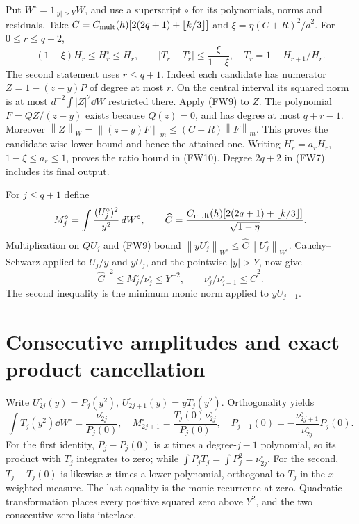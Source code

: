 \documentclass[11pt]{article}
\newcommand{\norm}[1]{\left\lVert#1\right\rVert}
\begin{document}
Put $W^\circ=1_{|y|>Y}W$, and use a superscript $\circ$ for its
polynomials, norms and residuals. Take
$C=C_{\rm mult}(h)[2(2q+1)+\lfloor k/3\rfloor]$ and
$\xi=\eta(C+R)^2/d^2$. For $0\le r\le q+2$,
\begin{equation}\tag{FW10}
 (1-\xi)H_r\le H_r^\circ\le H_r,\qquad
 |T_r-T_r^\circ|\le\frac{\xi}{1-\xi},\quad T_r=1-H_{r+1}/H_r.
\end{equation}
The second statement uses $r\le q+1$. Indeed each candidate has
numerator $Z=1-(z-y)P$ of degree at most $r$. On the central interval
its squared norm is at most $d^{-2}\int|Z|^2\dd W$ restricted there.
Apply (FW9) to $Z$. The polynomial $F=QZ/(z-y)$ exists because $Q(z)=0$,
and has degree at most $q+r-1$. Moreover
$\norm Z_W=\norm{(z-y)F}_m\le(C+R)\norm F_m$.
This proves the candidate-wise lower bound and hence the attained one.
Writing $H_r^\circ=a_rH_r$, $1-\xi\le a_r\le1$, proves the ratio
bound in (FW10). Degree $2q+2$ in (FW7) includes its final output.

For $j\le q+1$ define
\[
 M_j^\circ=\int\frac{(U_j^\circ)^2}{y^2}\,d W^\circ,
 \qquad \widehat C=\frac{C_{\rm mult}(h)[2(2q+1)+\lfloor k/3\rfloor]}{\sqrt{1-\eta}}.
\]
Multiplication on $QU_j$ and (FW9) bound
$\norm{yU_j^\circ}_{W^\circ}\le\widehat C\norm{U_j^\circ}_{W^\circ}$.
Cauchy--Schwarz applied to $U_j/y$ and $yU_j$, and the pointwise
$|y|>Y$, now give
\begin{equation}\tag{FW11}
 \widehat C^{-2}\le M_j^\circ/\nu_j^\circ\le Y^{-2},\qquad
 \nu_j^\circ/\nu_{j-1}^\circ\le\widehat C^2.
\end{equation}
The second inequality is the minimum monic norm applied to $yU_{j-1}$.

\section{Consecutive amplitudes and exact product cancellation}
Write $U_{2j}^\circ(y)=P_j(y^2)$, $U_{2j+1}^\circ(y)=yT_j(y^2)$.
Orthogonality yields
\begin{equation}\tag{FW12}
 \int T_j(y^2)\dd W^\circ=\frac{\nu_{2j}^\circ}{P_j(0)},\quad
 M_{2j+1}^\circ=\frac{T_j(0)\nu_{2j}^\circ}{P_j(0)},\quad
 P_{j+1}(0)=-\frac{\nu_{2j+1}^\circ}{\nu_{2j}^\circ}P_j(0).
\end{equation}
For the first identity, $P_j-P_j(0)$ is $x$ times a degree-$j-1$
polynomial, so its product with $T_j$ integrates to zero; while
$\int P_jT_j=\int P_j^2=\nu_{2j}^\circ$. For the second,
$T_j-T_j(0)$ is likewise $x$ times a lower polynomial, orthogonal to
$T_j$ in the $x$-weighted measure. The last equality is the monic
recurrence at zero. Quadratic transformation places every positive
squared zero above $Y^2$, and the two consecutive zero lists interlace.
\end{document}
